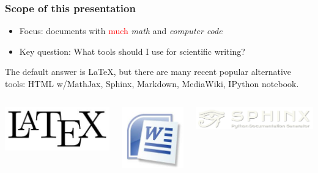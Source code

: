 \documentclass{beamer}
\newenvironment{graybox1admon}[1][]{\begin{block}{#1}}{\end{block}}
\begin{document}
\begin{frame}
\frametitle{Scope of this presentation}




\begin{itemize}
  \item Focus: documents with \textcolor{red}{much} \emph{math} and \emph{computer code}

  \item Key question: What tools should I use for scientific writing?
\end{itemize}

\noindent

\begin{graybox1admon}[]
The default answer is {\LaTeX}, but there are many
recent popular alternative tools: HTML w/MathJax,
Sphinx, Markdown, MediaWiki, IPython notebook.
\end{graybox1admon}




\begin{columns}
\begin{center}  %
  \centerline{\includegraphics[width=0.3\linewidth]{fig/LaTeX_logo.jpg}}
\end{center}


\begin{center}  %
  \centerline{\includegraphics[width=0.2\linewidth]{fig/MS_Word_logo.jpg}}
\end{center}


\begin{center}  %
  \centerline{\includegraphics[width=0.4\linewidth]{fig/sphinx_logo.png}}
\end{center}



\end{columns}
\end{frame}
\end{document}
